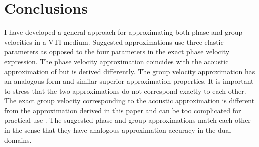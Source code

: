 \begin{comment}

Figure~\ref{fig:const} shows finite-difference wavefronts for an isotropic and
an anisotropic homogeneous media, compared with the exact solutions. The
anisotropic media has the parameters of the Greenhorn shale. The
finite-difference error decreases with finer sampling.


Figure~\ref{fig:marm} shows the first arrival wavefronts (traveltime contours)
computed in the ani\-so\-tro\-pic Marmousi model created by
\cite{Alkhalifah.sep.95.tariq3} in comparison with wavefronts for the
isotropic Marmousi model \cite[]{TLE13-09-09270936,TME00-00-00010194}. The model
parameters are shown in Figure~\ref{fig:marmmod}. The observed significant
difference in the wavefront position suggests a difference in the positioning
of seismic images when anisotropy is not properly taken into account.



\end{comment}

\section{Conclusions}

I have developed a general approach for approximating both phase and group
velocities in a VTI medium. Suggested approximations use three elastic
parameters as opposed to the four parameters in the exact phase velocity
expression. The phase velocity approximation coincides with the acoustic
approximation of \cite{GEO63-02-06230631,GEO65-04-12391250} but is derived
differently. The group velocity approximation has an analogous form and
similar superior approximation properties. It is important to stress that the
two approximations do not correspond exactly to each other. The exact group
velocity corresponding to the acoustic approximation is different from the
approximation derived in this paper and can be too complicated for practical
use \cite[]{EAE-1999-1049}. The suggested phase and group approximations match
each other in the sense that they have analogous approximation accuracy in the
dual domains.

